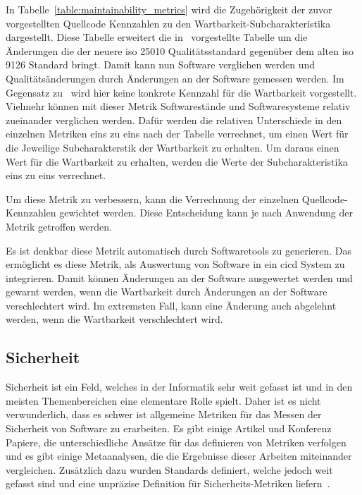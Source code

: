 \documentclass[12pt, a4paper, ngerman]{article}
\begin{document}
In Tabelle~\ref{table:maintainability_metrics} wird die Zugehörigkeit
der zuvor vorgestellten Quellcode Kennzahlen zu den
Wartbarkeit-Subcharakteristika dargestellt.
Diese Tabelle erweitert die in~\cite{maintainability_metrics}
vorgestellte Tabelle um die Änderungen die der neuere \ac{iso} 25010 Qualitätsstandard
gegenüber dem alten \ac{iso} 9126 Standard bringt.
Damit kann nun Software verglichen werden und Qualitätsänderungen
durch Änderungen an der Software gemessen werden.
Im Gegensatz zu~\cite{maintainability_metrics}
wird hier keine konkrete Kennzahl für die Wartbarkeit vorgestellt.
Vielmehr können mit dieser Metrik Softwarestände und Softwaresysteme relativ zueinander verglichen werden.
Dafür werden die relativen Unterschiede in den einzelnen Metriken eins zu eins nach der Tabelle verrechnet,
um einen Wert für die Jeweilige Subcharakterstik der Wartbarkeit zu erhalten.
Um daraus einen Wert für die Wartbarkeit zu erhalten,
werden die Werte der Subcharakteristika eins zu eins verrechnet.

Um diese Metrik zu verbessern,
kann die Verrechnung der einzelnen Quellcode-Kennzahlen
gewichtet werden.
Diese Entscheidung kann je nach Anwendung der Metrik getroffen werden.

Es ist denkbar diese Metrik automatisch durch
Softwaretools zu generieren.
Das ermöglicht es diese Metrik, als Auswertung von Software
in ein \ac{cicd} System zu integrieren.
Damit können Änderungen an der Software ausgewertet werden
und gewarnt werden, wenn die Wartbarkeit durch Änderungen an der Software verschlechtert wird.
Im extremsten Fall, kann eine Änderung auch abgelehnt werden, wenn die Wartbarkeit verschlechtert wird.

\subsection{Sicherheit}

Sicherheit ist ein Feld, welches in der Informatik sehr weit gefasst ist und in den meisten Themenbereichen eine elementare Rolle spielt.
Daher ist es nicht verwunderlich, dass es schwer ist allgemeine Metriken für das Messen der Sicherheit von Software zu erarbeiten.
Es gibt einige Artikel und Konferenz Papiere, die unterschiedliche Ansätze für das definieren von Metriken verfolgen und es gibt einige 
Metaanalysen, die die Ergebnisse dieser Arbeiten miteinander vergleichen. 
Zusätzlich dazu wurden Standards definiert, 
welche jedoch weit gefasst sind und eine unpräzise Definition für Sicherheits-Metriken liefern~\cite{MeFlado_Fernández-Medina_Piattini_2010}.
\end{document}
